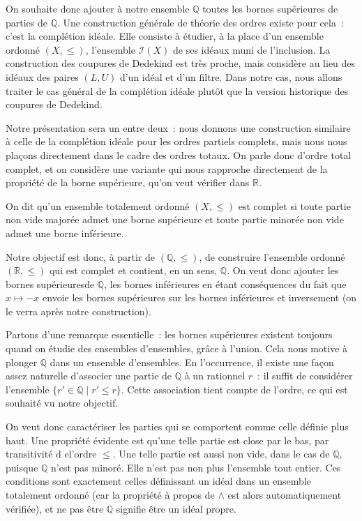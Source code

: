 On souhaite donc ajouter à notre ensemble $\mathbb Q$ toutes les bornes
supérieures de parties de $\mathbb Q$. Une construction générale de théorie des
ordres existe pour cela~: c'est la complétion idéale. Elle consiste à étudier,
à la place d'un ensemble ordonné $(X,\leq)$, l'ensemble $\mathcal I(X)$ de ses
idéaux muni de l'inclusion. La construction des coupures de Dedekind est très
proche, mais considère au lieu des idéaux des paires $(L,U)$ d'un idéal et d'un
filtre. Dans notre cas, nous allons traiter le cas général de la complétion
idéale plutôt que la version historique des coupures de Dedekind.

Notre présentation sera un entre deux~: nous donnons une construction
similaire à celle de la complétion idéale pour les ordres partiels complets,
mais nous nous plaçons directement dans le cadre des ordres totaux. On parle
donc d'ordre total complet, et on considère une variante qui nous rapproche
directement de la propriété de la borne supérieure, qu'on veut vérifier dans
$\mathbb R$.

\begin{definition}
  On dit qu'un ensemble totalement ordonné $(X,\leq)$ est complet si toute
  partie non vide majorée admet une borne supérieure et toute partie minorée
  non vide admet une borne inférieure.
\end{definition}

Notre objectif est donc, à partir de $(\mathbb Q,\leq)$, de construire
l'ensemble ordonné $(\mathbb R,\leq)$ qui est complet et contient, en un sens,
$\mathbb Q$. On veut donc \og ajouter les bornes supérieures\fg de $\mathbb Q$,
les bornes inférieures en étant conséquences du fait que $x\mapsto -x$ envoie
les bornes supérieures sur les bornes inférieures et inversement (on le verra
après notre construction).

Partons d'une remarque essentielle~: les bornes supérieures existent toujours
quand on étudie des ensembles d'ensembles, grâce à l'union. Cela nous motive à
plonger $\mathbb Q$ dans un ensemble d'ensembles. En l'occurrence, il existe une
façon assez naturelle d'associer une partie de $\mathbb Q$ à un rationnel $r$~:
il suffit de considérer l'ensemble $\{r' \in \mathbb Q \mid r' \leq r\}$. Cette
association tient compte de l'ordre, ce qui est souhaité vu notre objectif.

On veut donc caractériser les parties qui se comportent comme celle définie plus
haut. Une propriété évidente est qu'une telle partie est close par le bas, par
transitivité d el'ordre $\leq$. Une telle partie est aussi non vide, dans le cas
de $\mathbb Q$, puisque $\mathbb Q$ n'est pas minoré. Elle n'est pas non plus
l'ensemble tout entier. Ces conditions sont exactement celles définissant un
idéal dans un ensemble totalement ordonné (car la propriété à propos de $\land$
est alors automatiquement vérifiée), et ne pas être $\mathbb Q$ signifie être un
idéal propre.

